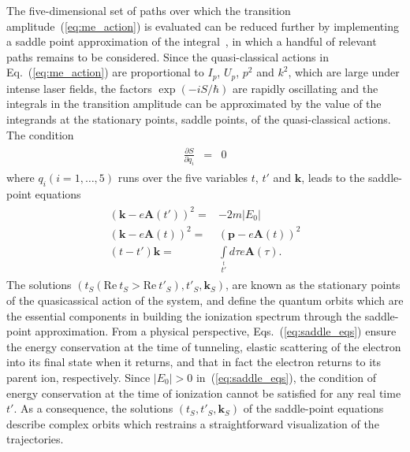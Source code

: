 The five-dimensional set of paths over which the transition
amplitude~(\ref{eq:me_action}) is evaluated can be reduced further by
implementing a saddle point approximation of the
integral~\cite{KopoldOptComm2000}, in which a handful of relevant
paths remains to be considered. Since the quasi-classical actions in
Eq.~(\ref{eq:me_action}) are proportional to $I_{p}$, $U_{p}$, $p^{2}$
and $k^{2}$, which are large under intense laser fields, the factors
$\exp(-i S/\hbar)$ are rapidly oscillating and the integrals in the
transition amplitude can be approximated by the value of the
integrands at the stationary points, saddle points, of the
quasi-classical actions. The condition
\begin{eqnarray}
\label{eq:S_stationary}
\begin{split}
\frac{\partial S}{\partial q_{i}} & = & 0
\end{split}
\end{eqnarray}
where $q_{i}(i =1, \dots, 5)$ runs over the five variables $t$, $t'$
and $\mathbf{k}$, leads to the saddle-point
equations~\cite{Lewenstein_1995,KopoldOptComm2000}
\begin{eqnarray}
\label{eq:saddle_eqs}
\begin{split}
\left( \mathbf{k} - e\mathbf{A}(t') \right)^{2} = &
-2m|E_{0}| \\
\left( \mathbf{k} - e\mathbf{A}(t)\right)^{2} = &
\left( \mathbf{p} - e\mathbf{A}(t) \right)^{2} \\
(t - t') \mathbf{k} = & \int\limits_{t'}\limits^{t}
d\tau e\mathbf{A}(\tau).
\end{split}
\end{eqnarray}
The solutions $(t_{S}(\mathrm{Re}\ t_{S} > \mathrm{Re}\ t'_{S}),
t'_{S}, \mathbf{k}_{S})$, are known as the stationary points of the
quasicassical action of the system, and define the quantum orbits
which are the essential components in building the ionization spectrum
through the saddle-point approximation. From a physical perspective,
Eqs.~(\ref{eq:saddle_eqs}) ensure the energy conservation at the time
of tunneling, elastic scattering of the electron into its final state
when it returns, and that in fact the electron returns to its parent
ion, respectively. Since $|E_{0}| > 0$ in~(\ref{eq:saddle_eqs}), the
condition of energy conservation at the time of ionization cannot be
satisfied for any real time $t'$. As a consequence, the solutions
$(t_{S}, t'_{S}, \mathbf{k}_{S})$ of the saddle-point equations
describe complex orbits which restrains a straightforward
visualization of the trajectories.

